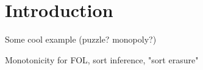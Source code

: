 
\section{Introduction}

Some cool example (puzzle? monopoly?)

Monotonicity for FOL, sort inference, "sort erasure"












